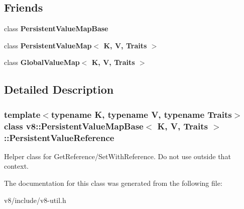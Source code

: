 \subsection*{Friends}
\begin{DoxyCompactItemize}
\item 
\mbox{\label{classv8_1_1PersistentValueMapBase_1_1PersistentValueReference_ae5cccd63ef6d94c509ad8b6970d4017d}} 
class {\bfseries Persistent\+Value\+Map\+Base}
\item 
\mbox{\label{classv8_1_1PersistentValueMapBase_1_1PersistentValueReference_a22fcaa9f3ba179f3bb566eda5b93790d}} 
class {\bfseries Persistent\+Value\+Map$<$ K, V, Traits $>$}
\item 
\mbox{\label{classv8_1_1PersistentValueMapBase_1_1PersistentValueReference_a41811cde55d1ef227d1ba28778d95d08}} 
class {\bfseries Global\+Value\+Map$<$ K, V, Traits $>$}
\end{DoxyCompactItemize}


\subsection{Detailed Description}
\subsubsection*{template$<$typename K, typename V, typename Traits$>$\newline
class v8\+::\+Persistent\+Value\+Map\+Base$<$ K, V, Traits $>$\+::\+Persistent\+Value\+Reference}

Helper class for Get\+Reference/\+Set\+With\+Reference. Do not use outside that context. 

The documentation for this class was generated from the following file\+:\begin{DoxyCompactItemize}
\item 
v8/include/v8-\/util.\+h\end{DoxyCompactItemize}
